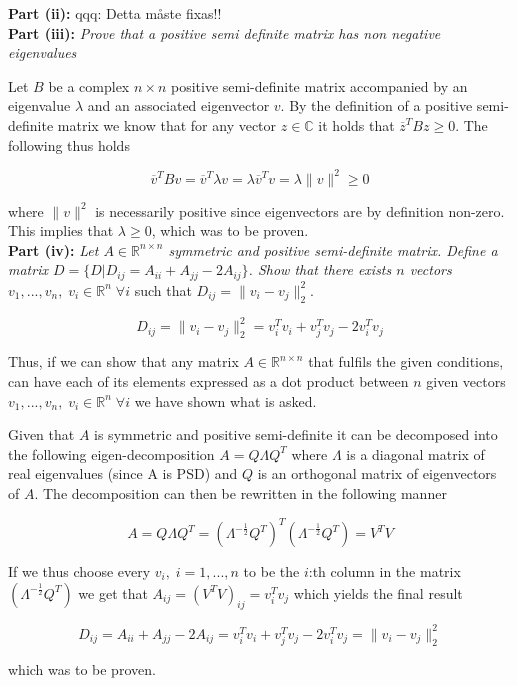 \textbf{Part (ii):} qqq: Detta måste fixas!!
\\

\textbf{Part (iii):} \textit{Prove that a positive semi definite matrix has non negative eigenvalues}

Let $B$ be a complex $n \times n$ positive semi-definite matrix accompanied by an eigenvalue $\lambda$ and an associated eigenvector $v$. By the definition of a positive semi-definite matrix we know that for any vector $z \in \mathbb{C}$ it holds that $\overline{z}^T B z \geq 0$. The following thus holds

\begin{equation}
  \overline{v}^T B v = \overline{v}^T \lambda v = \lambda \overline{v}^T v = \lambda \lVert v \rVert^2 \geq 0
  \label{iii_1}
\end{equation}

where $\lVert v \rVert^2$ is necessarily positive since eigenvectors are by definition non-zero. This implies that $\lambda \geq 0$, which was to be proven.
\\

\textbf{Part (iv):} \textit{Let $A \in \mathbb{R}^{n \times n}$ symmetric and positive semi-definite matrix. Define a matrix $D = \{ D | D_{ij} = A_{ii} + A_{jj} - 2A_{ij} \}$. Show that there exists $n$ vectors $v_1, ..., v_n, \; v_i \in \mathbb{R}^n \; \forall i$} such that $D_{ij} = \lVert v_i - v_j \rVert^2_2$.

\begin{equation}
  D_{ij} = \lVert v_i - v_j \rVert^2_2 = v_i^T v_i + v_j^T v_j - 2v_i^T v_j
\end{equation}

Thus, if we can show that any matrix $A \in \mathbb{R}^{n \times n}$ that fulfils the given conditions, can have each of its elements expressed as a dot product between $n$ given vectors $v_1, ..., v_n, \; v_i \in \mathbb{R}^n \; \forall i$ we have shown what is asked.

Given that $A$ is symmetric and positive semi-definite it can be decomposed into the following eigen-decomposition $A = Q \Lambda Q^T$ where $\Lambda$ is a diagonal matrix of real eigenvalues (since A is PSD) and $Q$ is an orthogonal matrix of eigenvectors of $A$. The decomposition can then be rewritten in the following manner

\begin{equation}
  A = Q \Lambda Q^T = (\Lambda^{-\frac{1}{2}} Q^T)^T (\Lambda^{-\frac{1}{2}} Q^T) = V^T V
\end{equation}

If we thus choose every $v_i, \; i = 1 ,..., n$ to be the $i$:th column in the matrix $(\Lambda^{-\frac{1}{2}} Q^T)$ we get that $A_{ij} = (V^T V)_{ij} = v_i^T v_j$ which yields the final result

\begin{equation}
  D_{ij} = A_{ii} + A_{jj} - 2A_{ij} = v_i^T v_i + v_j^T v_j - 2v_i^T v_j = \lVert v_i - v_j \rVert^2_2
\end{equation}

which was to be proven.

